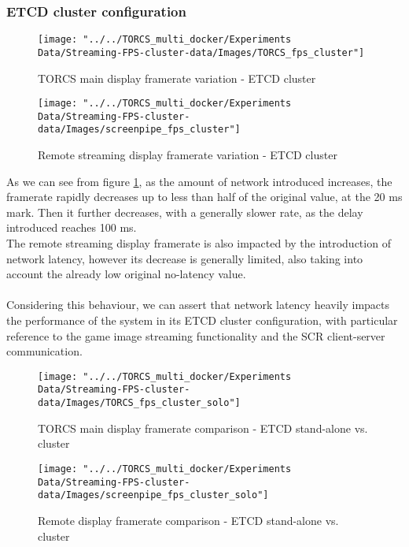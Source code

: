 \subsubsection{ETCD cluster configuration}
\begin{figure}[h!]
	\centering
	\texttt{[image: "../../TORCS\_multi\_docker/Experiments Data/Streaming-FPS-cluster-data/Images/TORCS\_fps\_cluster"]}
	\caption[TORCS main display framerate variation - ETCD cluster]{TORCS main display framerate variation - ETCD cluster}
	\label{fig:torcs-merged-fps-etcd-cluster}
\end{figure}
\begin{figure}[h!]
	\centering
	\texttt{[image: "../../TORCS\_multi\_docker/Experiments Data/Streaming-FPS-cluster-data/Images/screenpipe\_fps\_cluster"]}
	\caption[Remote streaming display framerate variation - ETCD cluster]{Remote streaming display framerate variation - ETCD cluster}
	\label{fig:screenpipe-merged-fps-etcd-cluster}
\end{figure}
As we can see from figure \ref{fig:torcs-merged-fps-etcd-cluster}, as the amount of network introduced increases, the framerate rapidly decreases up to less than half of the original value, at the 20 ms mark. Then it further decreases, with a generally slower rate, as the delay introduced reaches 100 ms. \\
The remote streaming display framerate is also impacted by the introduction of network latency, however its decrease is generally limited, also taking into account the already low original no-latency value. \\ \\
Considering this behaviour, we can assert that network latency heavily impacts the performance of the system in its ETCD cluster configuration, with particular reference to the game image streaming functionality and the SCR client-server communication.
\begin{figure}[h!]
	\centering
	\texttt{[image: "../../TORCS\_multi\_docker/Experiments Data/Streaming-FPS-cluster-data/Images/TORCS\_fps\_cluster\_solo"]}
	\caption[TORCS main display framerate comparison - ETCD stand-alone vs. cluster]{TORCS main display framerate comparison - ETCD stand-alone vs. cluster}
	\label{fig:torcs-fps-cluster-solo-etcd}
\end{figure}
\begin{figure}[h!]
	\centering
	\texttt{[image: "../../TORCS\_multi\_docker/Experiments Data/Streaming-FPS-cluster-data/Images/screenpipe\_fps\_cluster\_solo"]}
	\caption[Remote display framerate comparison - ETCD stand-alone vs. cluster]{Remote display framerate comparison - ETCD stand-alone vs. cluster}
	\label{fig:screenpipe-fps-cluster-solo-etcd}
\end{figure}
